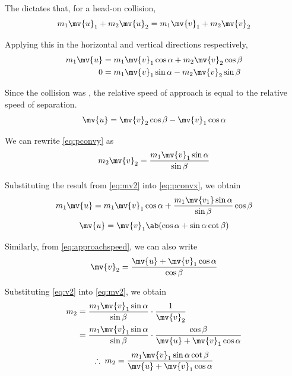 The  dictates that, for a
head-on collision,
\begin{equation}
  m_1\mv{u}_1 + m_2\mv{u}_2 = m_1\mv{v}_1 + m_2\mv{v}_2
\end{equation}

Applying this in the horizontal and vertical directions respectively,
\begin{align}
  \label{eq:pconvx}
  m_1\mv{u} &= m_1\mv{v}_1 \cos\alpha + m_2\mv{v}_2 \cos \beta \\
  0 &= m_1\mv{v}_1 \sin \alpha - m_2\mv{v}_2 \sin \beta
  \label{eq:pconvy}
\end{align}

Since the collision was , the relative speed of approach
is equal to the relative speed of separation.
\begin{equation}
  \mv{u} = \mv{v}_2 \cos \beta - \mv{v}_1 \cos \alpha
  \label{eq:approachspeed}
\end{equation}

We can rewrite \cref{eq:pconvy} as
\begin{equation}
  m_2\mv{v}_2 = \dfrac{m_1\mv{v}_1\sin\alpha}{\sin\beta}
  \label{eq:mv2}
\end{equation}

Substituting the result from \cref{eq:mv2} into \cref{eq:pconvx}, we obtain
\begin{align*}
  m_1\mv{u} &= m_1\mv{v}_1\cos\alpha +
  \dfrac{m_1\mv{v_1}\sin\alpha}{\sin\beta}\cos\beta \\
\end{align*}
\begin{equation}
  \mv{u} = \mv{v}_1\ab(\cos\alpha + \sin\alpha\cot\beta)
  \label{eq:uv1}
\end{equation}

Similarly, from \cref{eq:approachspeed}, we can also write
\begin{equation}
  \mv{v}_2 = \dfrac{\mv{u} + \mv{v}_1\cos\alpha}{\cos\beta}
  \label{eq:v2}
\end{equation}

Substituting \cref{eq:v2} into \cref{eq:mv2}, we obtain
\begin{align*}
  m_2 &= \dfrac{m_1\mv{v}_1\sin\alpha}{\sin\beta} \cdot \dfrac{1}{\mv{v}_2} \\
  &=
  \dfrac{m_1\mv{v}_1\sin\alpha}{\sin\beta}\cdot\dfrac{\cos\beta}{\mv{u}
  + \mv{v}_1\cos\alpha} \\
\end{align*}
\begin{equation}
  \therefore\; m_2
  =\dfrac{m_1\mv{v}_1\sin\alpha\cot\beta}{\mv{u}+\mv{v}_1\cos\alpha}
  \label{eq:m2}
\end{equation}

